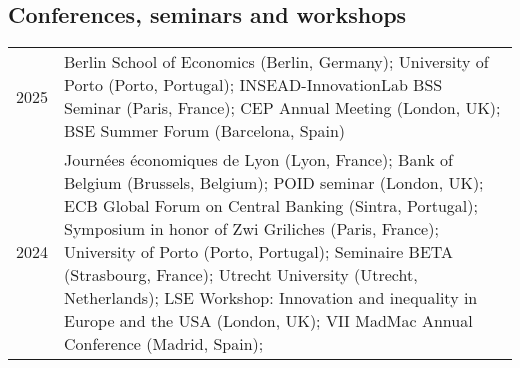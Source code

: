 \documentclass[12pt]{article}
\begin{document}
\subsection*{Conferences, seminars and workshops}
\begin{footnotesize}
\begin{tabular}{p{1cm}p{13cm}}
2025 & Berlin School of Economics (Berlin, Germany); University of Porto (Porto, Portugal); INSEAD-InnovationLab BSS Seminar (Paris, France); CEP Annual Meeting (London, UK); BSE Summer Forum (Barcelona, Spain) \\

2024 & Journées économiques de Lyon (Lyon, France); Bank of Belgium (Brussels, Belgium); POID seminar (London, UK); ECB Global Forum on Central Banking (Sintra, Portugal); Symposium in honor of Zwi Griliches (Paris, France);  University of Porto (Porto, Portugal); Seminaire BETA (Strasbourg, France); Utrecht University (Utrecht, Netherlands); LSE Workshop: Innovation and inequality in Europe and the USA (London, UK); VII MadMac Annual Conference (Madrid, Spain); \\


\end{tabular}
\end{footnotesize}
\end{document}
